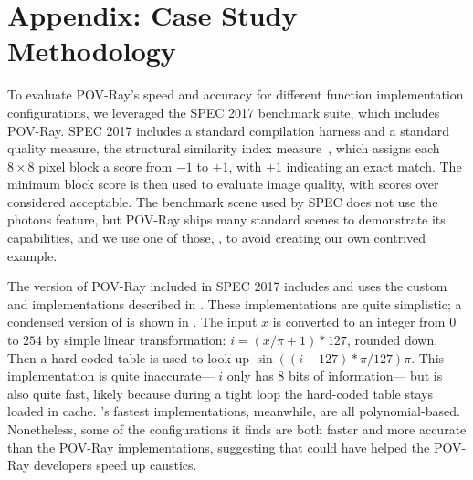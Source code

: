 \documentclass[paper.tex]{subfiles}
\begin{document}
\section{Appendix: Case Study Methodology}
\label{sec:cs-methods}

To evaluate POV-Ray's speed and accuracy
  for different function implementation configurations,
  we leveraged the SPEC 2017 benchmark suite,
  which includes POV-Ray.
SPEC 2017 includes a standard compilation harness
  and a standard quality measure,
  the structural similarity index measure~\cite{ssim},
  which assigns each $8\times8$ pixel block a score from $-1$ to $+1$,
  with $+1$ indicating an exact match.
The minimum block score is then used to evaluate image quality,
  with scores over \nSpecThreshold considered acceptable.
The benchmark scene used by SPEC does not use the photons feature,
  but POV-Ray ships many standard scenes to demonstrate its capabilities,
  and we use one of those, ,
  to avoid creating our own contrived example.

The version of POV-Ray included in SPEC 2017
  includes and uses the custom  and  implementations
  described in .
These implementations are quite simplistic;
  a condensed version of  is shown in .
The input $x$ is converted to an integer from $0$ to $254$
  by simple linear transformation:
  $i = (x / \pi + 1) * 127$, rounded down.
Then a hard-coded table is used to look up $\sin((i - 127)*\pi / 127) \pi$.
This implementation is quite inaccurate---%
  $i$ only has 8 bits of information---%
  but is also quite fast, likely because during a tight loop
  the hard-coded table stays loaded in cache.
\name's fastest implementations, meanwhile, are all polynomial-based.
Nonetheless, some of the configurations it finds
  are both faster and more accurate than the POV-Ray implementations,
  suggesting that \name could have helped the POV-Ray developers
  speed up caustics.
\end{document}
